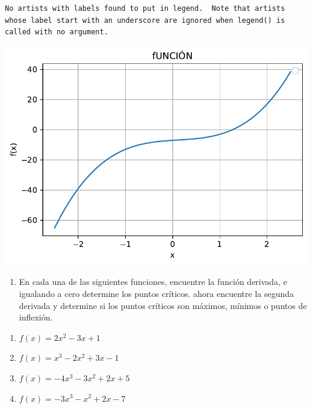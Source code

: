 \documentclass[
]{article}
\providecommand{\tightlist}{%
  \setlength{\itemsep}{0pt}\setlength{\parskip}{0pt}}\usepackage{longtable,booktabs,array}
\begin{document}
\begin{verbatim}
No artists with labels found to put in legend.  Note that artists whose label start with an underscore are ignored when legend() is called with no argument.
\end{verbatim}

\includegraphics{taller_files/figure-pdf/cell-6-output-2.pdf}

\begin{enumerate}
\def\labelenumi{\arabic{enumi}.}
\setcounter{enumi}{1}
\tightlist
\item
  En cada una de las siguientes funciones, encuentre la función
  derivada, e igualando a cero determine los puntos críticos. ahora
  encuentre la segunda derivada y determine si los puntos críticos son
  máximos, mínimos o puntos de inflexión.
\end{enumerate}

\begin{enumerate}
\def\labelenumi{\alph{enumi}.}
\item
  \(f(x) = 2x^2 - 3x + 1\)
\item
  \(f(x) = x^3 - 2x^2 + 3x - 1\)
\item
  \(f(x) = -4x^3 - 3x^2 + 2x + 5\)
\item
  \(f(x) = - 3x^3 - x^2 + 2x - 7\)
\end{enumerate}
\end{document}
